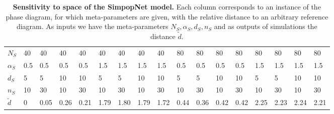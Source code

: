 \begin{table}[!ht]
\caption{\textbf{Sensitivity to space of the SimpopNet model.} Each column corresponds to an instance of the phase diagram, for which meta-parameters are given, with the relative distance to an arbitrary reference diagram. As inputs we have the meta-parameters $N_S,\alpha_S,d_S,n_S$ and as outputs of simulations the distance $\tilde{d}$.\label{tab:macrocoevolexplo:spacematters}}
\centering
\begin{tabular}{|l|l|l|l|l|l|l|l|l|l|l|l|l|l|l|l|l|}
\hline
$N_S$ & 40 & 40 & 40 & 40 & 40 & 40 & 40 & 40 & 80 & 80 & 80 & 80 & 80 & 80 & 80 & 80\\
$\alpha_S$ & 0.5 & 0.5 & 0.5 & 0.5 & 1.5 & 1.5 & 1.5 & 1.5 & 0.5 & 0.5 & 0.5 & 0.5 & 1.5 & 1.5 & 1.5 & 1.5\\
$d_S$ & 5 & 5 & 10 & 10 & 5 & 5 & 10 & 10 & 5 & 5 & 10 & 10 & 5 & 5 & 10 & 10\\
$n_S$ & 10 & 30 & 10 & 30 & 10 & 30 & 10 & 30 & 10 & 30 & 10 & 30 & 10 & 30 & 10 & 30\\\hline
$\tilde{d}$ & 0 & 0.05 & 0.26 & 0.21 & 1.79 & 1.80 & 1.79 & 1.72 & 0.44 & 0.36 & 0.42 & 0.42 & 2.25 & 2.23 & 2.24 & 2.21\\\hline
\end{tabular}
\end{table}



